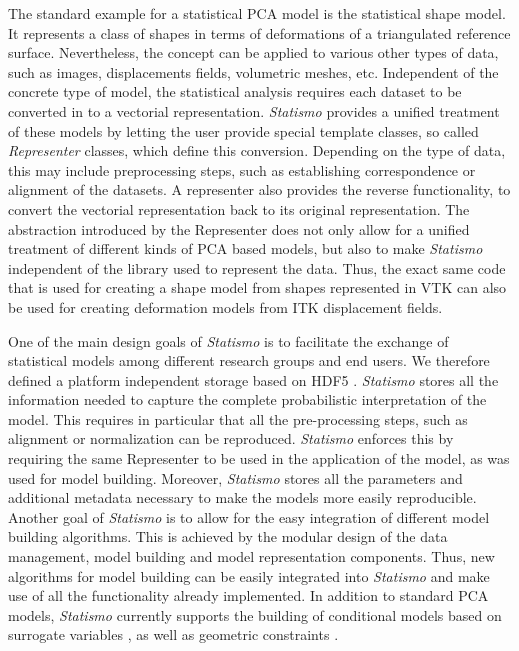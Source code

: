 \documentclass{InsightArticle}
\newcommand{\Statismo}{\emph{Statismo}\xspace}
\begin{document}
The standard example for a statistical PCA model is the statistical
shape model.  It represents a class of shapes in terms of deformations
of a triangulated reference surface. Nevertheless, the concept can be
applied to various other types of data, such as images, displacements
fields, volumetric meshes, etc. Independent of the concrete type of
model, the statistical analysis requires each dataset to be converted
in to a vectorial representation.  \Statismo provides a unified
treatment of these models by letting the user provide special template
classes, so called \emph{Representer} classes, which define this
conversion.  Depending on the type of data, this may include
preprocessing steps, such as establishing correspondence or alignment of
the datasets.  A representer also provides the reverse
functionality, to convert the vectorial representation back to its
original representation.  The abstraction introduced by the
Representer does not only allow for a unified treatment of different
kinds of PCA based models, but also to make \Statismo independent of
the library used to represent the data. Thus, the exact same code that
is used for creating a shape model from shapes represented in VTK can
also be used for creating deformation models from ITK displacement
fields.

One of the main design goals of \Statismo is to facilitate the
exchange of statistical models among different research groups and end
users. We therefore defined a platform independent storage based on
HDF5 \cite{hdf5}. \Statismo stores all the information needed to
capture the complete probabilistic interpretation of the model.  This
requires in particular that all the pre-processing steps, such as
alignment or normalization can be reproduced. \Statismo enforces this
by requiring the same Representer to be used in the application of the
model, as was used for model building. Moreover, \Statismo stores all
the parameters and additional metadata necessary to make the models
more easily reproducible.  Another goal of \Statismo is to allow for
the easy integration of different model building algorithms. This is
achieved by the modular design of the data management, model building
and model representation components. Thus, new algorithms for model
building can be easily integrated into \Statismo and make use of all
the functionality already implemented.  In addition to standard PCA
models, \Statismo currently supports the building of conditional
models based on surrogate variables \cite{blanc_conditional_2009,blanc_statistical_2011}, as
well as geometric constraints \cite{luthi_probabilistic_2009}.
\end{document}
